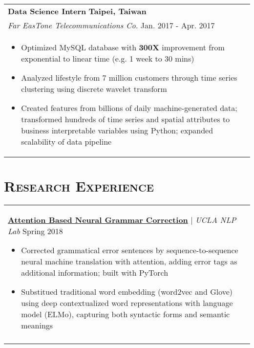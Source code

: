 \documentclass[letterpaper,11pt]{article} %
\begin{document}
{\begin{tabular}{p{18.5cm}}
{\bf{Data Science Intern}} \hfill \bf{Taipei, Taiwan}\\
{\it Far EasTone Telecommunications Co.} \hfill  Jan. 2017 - Apr. 2017\\%
\begin{itemize}
\vspace{-3mm}
\item Optimized MySQL database with {\bf300X} improvement from exponential to linear time (e.g. 1 week to 30 mins) 
\item Analyzed lifestyle from 7 million customers through time series clustering using discrete wavelet transform
\item Created features from billions of daily machine-generated data; transformed hundreds of time series and spatial attributes to business interpretable variables using Python; expanded scalability of data pipeline \vspace*{-\baselineskip}
\end{itemize} 
\vspace{.1mm}
\end{tabular}


\section{\Large\bf\textsc{Research Experience}}
\begin{tabular}{p{18.5cm}}

\href{}{\bf{Attention Based Neural Grammar Correction}} | {\it{UCLA NLP Lab}} \hfill Spring 2018
\begin{itemize}
\item Corrected grammatical error sentences by sequence-to-sequence neural machine translation with attention, adding error tags as additional information; built with PyTorch
\item Substitued traditional word embedding (word2vec and Glove) using deep contextualized word representations with language model (ELMo), capturing both syntactic forms and semantic meanings \vspace*{-\baselineskip}
\end{itemize} \\
\vspace{.1mm}


\end{tabular}}
\end{document}
